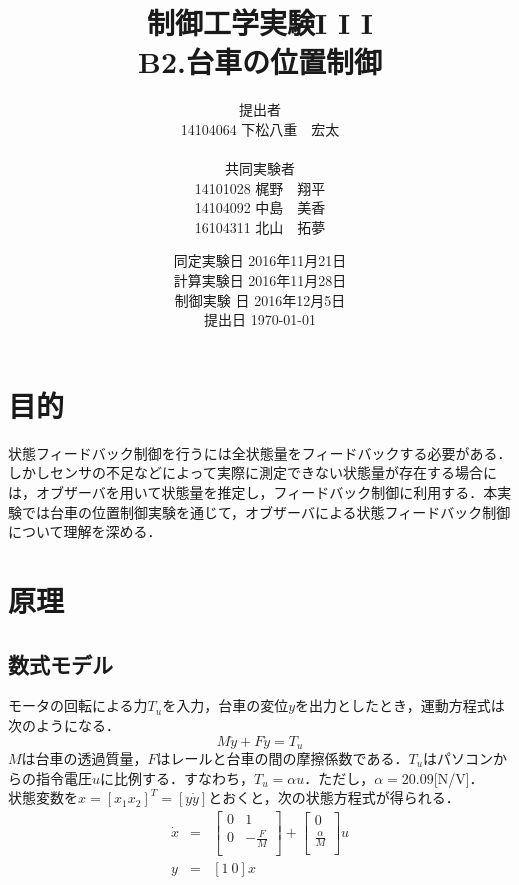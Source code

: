 \documentclass[11pt,a4paper]{jsarticle}
\begin{document}
\title{制御工学実験I \hspace{-0.1mm} I \hspace{-0.1mm} I \\ B2.台車の位置制御}
\author{提出者 \\ 14104064 下松八重　宏太 \\ \\ 共同実験者 \\ 14101028 梶野　翔平 \\ 14104092 中島　美香 \\ 16104311 北山　拓夢}
\date{同定実験日 2016年11月21日 \\ 計算実験日 2016年11月28日 \\ 制御実験
日 2016年12月5日 \\ 提出日 \today}



\maketitle
\thispagestyle{empty}
\newpage


\section{目的}
状態フィードバック制御を行うには全状態量をフィードバックする必要がある．しかしセンサの不足などによって実際に測定できない状態量が存在する場合には，オブザーバを用いて状態量を推定し，フィードバック制御に利用する．本実験では台車の位置制御実験を通じて，オブザーバによる状態フィードバック制御について理解を深める．

\section{原理}
  \subsection{数式モデル}
  モータの回転による力$T_u$を入力，台車の変位$y$を出力としたとき，運動方程式は次のようになる．
  \begin{equation}
   M\ddot{y}+F\ddot{y}=T_u
  \end{equation}
  $M$は台車の透過質量，$F$はレールと台車の間の摩擦係数である．$T_u$はパソコンからの指令電圧$u$に比例する．すなわち，$T_u = \alpha u$．ただし，$\alpha = 20.09$[N/V]． \\
  状態変数を$x = [x_1 x_2]^T = [y \dot{y}]$とおくと，次の状態方程式が得られる．
  \begin{eqnarray}
   \dot{x} &=& \left[
		\begin{array}{cc}
		 0 & 1 \\
		 0 & -\frac{F}{M}\\
		\end{array}
		  \right]
   + \left[
      \begin{array}{c}
       0 \\
       \frac{\alpha}{M}\\
      \end{array}
     \right]u \nonumber \\
   y &=& [1 \ 0]x
  \end{eqnarray}
\end{document}
